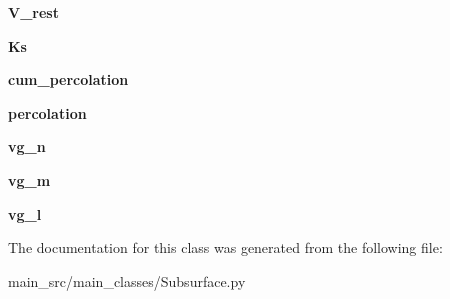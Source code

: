 \begin{DoxyCompactItemize}
\item 
\hypertarget{classmain__src_1_1main__classes_1_1Subsurface_1_1SubArrs_adcd4e51ffdd706c457b1dc064fc3789a}{{\bfseries V\-\_\-rest}}\label{classmain__src_1_1main__classes_1_1Subsurface_1_1SubArrs_adcd4e51ffdd706c457b1dc064fc3789a}

\item 
\hypertarget{classmain__src_1_1main__classes_1_1Subsurface_1_1SubArrs_a0941025064ddd6dcc38522b21a93388d}{{\bfseries Ks}}\label{classmain__src_1_1main__classes_1_1Subsurface_1_1SubArrs_a0941025064ddd6dcc38522b21a93388d}

\item 
\hypertarget{classmain__src_1_1main__classes_1_1Subsurface_1_1SubArrs_ac3240b6ebc5f51083eb04d9e83c28682}{{\bfseries cum\-\_\-percolation}}\label{classmain__src_1_1main__classes_1_1Subsurface_1_1SubArrs_ac3240b6ebc5f51083eb04d9e83c28682}

\item 
\hypertarget{classmain__src_1_1main__classes_1_1Subsurface_1_1SubArrs_ad4a08276da149feb5e552be0689879e2}{{\bfseries percolation}}\label{classmain__src_1_1main__classes_1_1Subsurface_1_1SubArrs_ad4a08276da149feb5e552be0689879e2}

\item 
\hypertarget{classmain__src_1_1main__classes_1_1Subsurface_1_1SubArrs_ad806fcb69da5ec61bded892f8948e7ec}{{\bfseries vg\-\_\-n}}\label{classmain__src_1_1main__classes_1_1Subsurface_1_1SubArrs_ad806fcb69da5ec61bded892f8948e7ec}

\item 
\hypertarget{classmain__src_1_1main__classes_1_1Subsurface_1_1SubArrs_af54ca1eb013a2d537f63997b643200e3}{{\bfseries vg\-\_\-m}}\label{classmain__src_1_1main__classes_1_1Subsurface_1_1SubArrs_af54ca1eb013a2d537f63997b643200e3}

\item 
\hypertarget{classmain__src_1_1main__classes_1_1Subsurface_1_1SubArrs_ad50eadcf531ed7689a5fafcc1538931a}{{\bfseries vg\-\_\-l}}\label{classmain__src_1_1main__classes_1_1Subsurface_1_1SubArrs_ad50eadcf531ed7689a5fafcc1538931a}

\end{DoxyCompactItemize}


The documentation for this class was generated from the following file\-:\begin{DoxyCompactItemize}
\item 
main\-\_\-src/main\-\_\-classes/Subsurface.\-py\end{DoxyCompactItemize}
